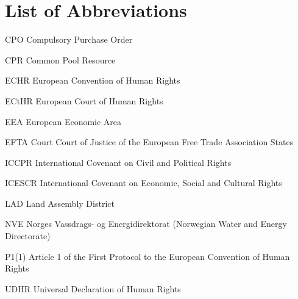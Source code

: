 \documentclass[a4paper,twoside,openright,10pt]{thesisPSnPDF}
\makeatletter
\newcommand{\tocfill}{\cleaders\hbox{$\m@th \mkern\@dotsep mu . \mkern\@dotsep mu$}\hfill}
\newcommand{\abbrlabel}[1]{\makebox[3cm][l]{\textbf{#1}\ \tocfill}}
\newenvironment{abbreviations}{\begin{list}{}{\renewcommand{\makelabel}{\abbrlabel}%
        \setlength{\labelwidth}{3cm}\setlength{\leftmargin}{\labelwidth+\labelsep}%
                                              \setlength{\itemsep}{0pt}}}{\end{list}}
\makeatother
\begin{document}
\renewcommand\baselinestretch{1.5}
\baselineskip=24pt




\setcounter{secnumdepth}{4}
\setcounter{tocdepth}{2}



\tableofcontents

%






\section*{List of Abbreviations}

\begin{abbreviations}
\item[CPO]{Compulsory Purchase Order}
\item[CPR]{Common Pool Resource}
\item[ECHR]{European Convention of Human Rights}
\item[ECtHR]{European Court of Human Rights}
\item[EEA]{European Economic Area}
\item[EFTA Court]{Court of Justice of the European Free Trade Association States}
\item[ICCPR]{International Covenant on Civil and Political Rights}
\item[ICESCR]{International Covenant on Economic, Social and Cultural Rights}
\item[LAD]{Land Assembly District}
\item[NVE]{Norges Vassdrags- og Energidirektorat (Norwegian Water and Energy \linebreak Directorate)}
\item[P1(1)]{Article 1 of the First Protocol to the European Convention of Human Rights}
\item[UDHR]{Universal Declaration of Human Rights}
\end{abbreviations}
\end{document}
